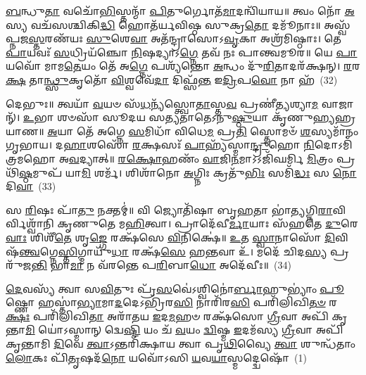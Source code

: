 \-\ul{𑌬}\-𑌨𑍍𑌧𑍁\-\ul{𑌤𑌾} 𑌵𑌚𑍋᳴\-\ul{𑌭𑌿}\-𑌸𑍍𑌤𑌨𑍍𑌮𑌾᳴ \ul{𑌪𑌿}\-𑌤𑍁𑌰𑍍𑌗𑍋𑌤᳴\-\ul{𑌮𑌾}\-𑌦𑌨𑍍𑌵𑌿᳴𑌯𑌾𑌯॥ 𑌤𑍍𑌵𑌂 𑌨𑍋᳴ \ul{𑌅}\-𑌸𑍍𑌯 𑌵𑌚᳴𑌸𑌶𑍍𑌚𑌿𑌕𑌿\-\ul{𑌦𑍍𑌧𑌿} 𑌹𑍋𑌤᳴𑌰𑍍𑌯𑌵𑌿𑌷𑍍𑌠 𑌸𑍁𑌕𑍍𑌰\-\ul{𑌤𑍋} 𑌦𑌮𑍂᳴𑌨𑌾𑌃॥ 𑌅𑌸𑍍𑌵᳴𑌪𑍍𑌨𑌜\-\ul{𑌸𑍍𑌤}\-𑌰𑌣᳴𑌯𑌃 \ul{𑌸𑍁}\-𑌶𑍇\-\ul{𑌵𑌾} 𑌅𑌤᳴𑌨𑍍𑌦𑍍𑌰𑌾𑌸𑍋\-𑌽\-\ul{𑌵𑍃}\-𑌕𑌾 𑌅𑌶𑍍𑌰᳴𑌮𑌿𑌷𑍍𑌠𑌾𑌃। 𑌤𑍇 \ul{𑌪𑌾}\-𑌯𑌵𑌃᳴ \ul{𑌸}\-𑌧𑍍𑌰𑌿𑌯᳴𑌞𑍍𑌚𑍋 \ul{𑌨𑌿}\-𑌷𑌦𑍍𑌯𑌾\-𑌽\-\ul{𑌗𑍍𑌨𑍇} 𑌤𑌵᳴ 𑌨𑌃 𑌪𑌾𑌨𑍍𑌤𑍍𑌵𑌮𑍂𑌰॥ 𑌯𑍇 \ul{𑌪𑌾}\-𑌯𑌵𑍋᳴ 𑌮𑌾𑌮\-\ul{𑌤𑍇}\-𑌯𑌂 𑌤𑍇᳴ 𑌅\-\ul{𑌗𑍍𑌨𑍇} 𑌪𑌶𑍍𑌯᳴𑌨𑍍𑌤𑍋 \ul{𑌅}\-𑌨𑍍𑌧𑌂 𑌦𑍁᳴\-\ul{𑌰𑌿}\-𑌤𑌾𑌦𑌰᳴𑌕𑍍𑌷𑌨𑍍। \ul{𑌰}\-𑌰\-\ul{𑌕𑍍𑌷} 𑌤𑌾\-\ul{𑌨𑍍𑌥𑍍𑌸𑍁}\-𑌕𑍃𑌤𑍋᳴ \ul{𑌵𑌿}\-𑌶𑍍𑌵𑌵𑍇᳴\-\ul{𑌦𑌾} 𑌦𑌿𑌫𑍍𑌸᳴\-\ul{𑌨𑍍𑌤} 𑌇\-\ul{𑌦𑍍𑌰𑌿}\-𑌪\-\ul{𑌵𑍋} 𑌨𑌾 𑌹᳴~(32)

𑌦𑍇𑌭𑍁𑌃॥ 𑌤𑍍𑌵𑌯𑌾᳴ \ul{𑌵}\-𑌯𑍞 𑌸᳴\-\ul{𑌧}\-𑌨𑍍𑌯᳴𑌸𑍍𑌤𑍍𑌵𑍋\-\ul{𑌤𑌾}\-𑌸𑍍𑌤\-\ul{𑌵} 𑌪𑍍𑌰𑌣𑍀॑𑌤𑍍𑌯𑌶𑍍𑌯𑌾\-\ul{𑌮} 𑌵𑌾𑌜𑌾𑌨𑍍᳴। \ul{𑌉}\-𑌭𑌾 𑌶𑍞𑌸𑌾᳴ 𑌸𑍂𑌦𑌯 𑌸𑌤𑍍𑌯𑌤𑌾𑌤𑍇\-𑌽𑌨𑍁\-\ul{𑌷𑍍𑌠𑍁}\-𑌯𑌾 𑌕𑍃᳴𑌣𑍁𑌹𑍍𑌯𑌹𑍍𑌰𑌯𑌾𑌣॥ \ul{𑌅}\-𑌯𑌾 𑌤𑍇᳴ 𑌅𑌗𑍍𑌨𑍇 \ul{𑌸}\-𑌮𑌿𑌧𑌾᳴ 𑌵𑌿𑌧𑍇\-\ul{𑌮} 𑌪𑍍𑌰\-\ul{𑌤𑌿} 𑌸𑍍𑌤𑍋𑌮𑍞᳴ \ul{𑌶}\-𑌸𑍍𑌯𑌮𑌾᳴𑌨𑌂 𑌗𑍃𑌭𑌾𑌯। 𑌦\-\ul{𑌹𑌾}\-𑌶𑌸𑍋᳴ \ul{𑌰}\-𑌕𑍍𑌷𑌸𑌃᳴ \ul{𑌪𑌾}\-𑌹𑍍𑌯᳴𑌸𑍍𑌮𑌾\-\ul{𑌨𑍍𑌦𑍍𑌰𑍁}\-𑌹𑍋 \ul{𑌨𑌿}\-𑌦𑍋𑌽𑌮𑌿᳴𑌤𑍍𑌰𑌮𑌹𑍋 𑌅\-\ul{𑌵}\-𑌦𑍍𑌯𑌾𑌤𑍍॥ \ul{𑌰}\-\-\ul{𑌕𑍍𑌷𑍋}\-𑌹𑌣𑌂᳴ \ul{𑌵𑌾}\-𑌜𑌿\-\ul{𑌨}\-𑌮𑌾\-𑌽\-𑌽𑌜𑌿᳴𑌘𑌰𑍍𑌮𑌿 \ul{𑌮𑌿}\-𑌤𑍍𑌰𑌂 𑌪𑍍𑌰𑌥𑌿᳴\-\ul{𑌷𑍍𑌠}\-𑌮𑍁𑌪᳴ 𑌯𑌾\-\ul{𑌮𑌿} 𑌶𑌰𑍍𑌮᳴। 𑌶𑌿𑌶𑌾᳴𑌨𑍋 \ul{𑌅}\-𑌗𑍍𑌨𑌿𑌃 𑌕𑍍𑌰𑌤𑍁᳴\-\ul{𑌭𑌿𑌃} 𑌸𑌮𑌿᳴\-\ul{𑌦𑍍𑌧𑌃} 𑌸 \ul{𑌨𑍋} 𑌦𑌿\-\ul{𑌵𑌾}\-~(33)

𑌸 \ul{𑌰𑌿}\-𑌷𑌃 𑌪𑌾᳴\-\ul{𑌤𑍁} 𑌨𑌕𑍍𑌤𑌮𑍍॑॥ 𑌵𑌿 𑌜𑍍𑌯𑍋𑌤𑌿᳴𑌷𑌾 𑌬𑍃\-\ul{𑌹}\-𑌤𑌾 𑌭𑌾॑\-\ul{𑌤𑍍𑌯}\-𑌗𑍍𑌨𑌿\-\ul{𑌰𑌾}\-𑌵𑌿𑌰𑍍𑌵𑌿𑌶𑍍𑌵𑌾᳴𑌨𑌿 𑌕𑍃𑌣𑍁𑌤𑍇 𑌮\-\ul{𑌹𑌿}\-𑌤𑍍𑌵𑌾। 𑌪𑍍𑌰𑌾𑌦𑍇᳴𑌵𑍀\-\ul{𑌰𑍍𑌮𑌾}\-𑌯𑌾𑌃 𑌸᳴𑌹𑌤𑍇 \ul{𑌦𑍁}\-𑌰𑍇\-\ul{𑌵𑌾𑌃} 𑌶𑌿𑌶𑍀᳴\-\ul{𑌤𑍇} 𑌶𑍃\-\ul{𑌙𑍍𑌗𑍇} 𑌰𑌕𑍍𑌷᳴𑌸𑍇 \ul{𑌵𑌿}\-𑌨𑌿𑌕𑍍𑌷𑍇॑॥ \ul{𑌉}\-𑌤 \ul{𑌸𑍍𑌵𑌾}\-𑌨𑌾𑌸𑍋᳴ \ul{𑌦𑌿}\-𑌵𑌿𑌷᳴\-\ul{𑌨𑍍𑌤𑍍𑌵}\-𑌗𑍍𑌨𑍇\-\ul{𑌸𑍍𑌤𑌿}\-𑌗𑍍𑌮𑌾𑌯𑍁᳴\-\ul{𑌧𑌾} 𑌰𑌕𑍍𑌷᳴\-\ul{𑌸𑍇} 𑌹\-\ul{𑌨𑍍𑌤}\-𑌵𑌾 𑌉᳴। 𑌮𑌦𑍇᳴ 𑌚𑌿𑌦\-\ul{𑌸𑍍𑌯} 𑌪𑍍𑌰𑌰𑍁᳴𑌜\-\ul{𑌨𑍍𑌤𑌿} 𑌭𑌾\-\ul{𑌮𑌾} 𑌨 𑌵᳴𑌰𑌨𑍍𑌤𑍇 𑌪\-\ul{𑌰𑌿}\-𑌬𑌾\-\ul{𑌧𑍋} 𑌅𑌦𑍇᳴𑌵𑍀𑌃॥~(34)

{}


\setcounter{anuvakam}{0}
\-\ul{𑌦𑍇}\-𑌵𑌸𑍍𑌯᳴ 𑌤𑍍𑌵𑌾 𑌸\-\ul{𑌵𑌿}\-𑌤𑍁𑌃 𑌪𑍍𑌰᳴\-\ul{𑌸}\-𑌵𑍇॑\-𑌽𑌶𑍍𑌵𑌿𑌨𑍋॑\-\ul{𑌰𑍍𑌬𑌾}\-𑌹𑍁\-𑌭𑍍𑌯𑌾𑌂॑ \ul{𑌪𑍂}\-𑌷𑍍𑌣𑍋 𑌹𑌸𑍍𑌤𑌾॑\-\ul{𑌭𑍍𑌯𑌾}\-𑌮𑌾\-\ul{𑌦}\-𑌦𑍇\-𑌽𑌭𑍍𑌰𑌿᳴𑌰\-\ul{𑌸𑌿} 𑌨𑌾𑌰𑌿᳴𑌰\-\ul{𑌸𑌿} 𑌪𑌰𑌿᳴𑌲𑌿𑌖𑌿\-\ul{𑌤}\-\-\ul{𑍞} 𑌰\-\ul{𑌕𑍍𑌷𑌃} 𑌪𑌰𑌿᳴𑌲𑌿𑌖𑌿\-\ul{𑌤𑌾} 𑌅𑌰𑌾᳴𑌤𑌯 \ul{𑌇}\-𑌦\-\ul{𑌮}\-𑌹𑍞 𑌰𑌕𑍍𑌷᳴𑌸𑍋 \ul{𑌗𑍍𑌰𑍀}\-𑌵𑌾 𑌅𑌪𑌿᳴ 𑌕𑍃𑌨𑍍𑌤𑌾\-\ul{𑌮𑌿} 𑌯𑍋॑\-𑌽𑌸𑍍𑌮𑌾𑌨𑍍 𑌦𑍍𑌵𑍇\-\ul{𑌷𑍍𑌟𑌿} 𑌯𑌂 𑌚᳴ \ul{𑌵}\-𑌯𑌂 \ul{𑌦𑍍𑌵𑌿}\-𑌷𑍍𑌮 \ul{𑌇}\-𑌦𑌮᳴𑌸𑍍𑌯 \ul{𑌗𑍍𑌰𑍀}\-𑌵𑌾 𑌅𑌪𑌿᳴ 𑌕𑍃𑌨𑍍𑌤𑌾𑌮𑌿 \ul{𑌦𑌿}\-𑌵𑍇 \ul{𑌤𑍍𑌵𑌾}\-\-𑌽𑌨𑍍𑌤𑌰𑌿᳴𑌕𑍍𑌷𑌾𑌯 𑌤𑍍𑌵𑌾 𑌪𑍃\-\ul{𑌥𑌿}\-𑌵𑍍𑌯𑍈 \ul{𑌤𑍍𑌵𑌾} 𑌶𑍁𑌨𑍍𑌧᳴𑌤𑌾𑌂 \ul{𑌲𑍋}\-𑌕𑌃 𑌪𑌿᳴\-\ul{𑌤𑍃}\-𑌷𑌦᳴\-\ul{𑌨𑍋} 𑌯𑌵𑍋᳴\-𑌽𑌸𑌿 \ul{𑌯}\-𑌵\-\ul{𑌯𑌾}\-𑌸𑍍𑌮𑌦𑍍𑌦𑍍𑌵𑍇𑌷𑍋᳴~(1)

